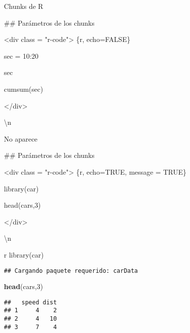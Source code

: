 \documentclass[
  ignorenonframetext,
]{beamer}
\newenvironment{Shaded}{\begin{snugshade}}{\end{snugshade}}
\newcommand{\DecValTok}[1]{\textcolor[rgb]{0.00,0.00,0.81}{#1}}
\newcommand{\FunctionTok}[1]{\textcolor[rgb]{0.13,0.29,0.53}{\textbf{#1}}}
\newcommand{\NormalTok}[1]{#1}
\begin{document}
\begin{frame}[fragile]{Chunks de R}
\begin{Shaded}
\begin{Highlighting}[]
\NormalTok{\#\# Parámetros de los chunks}

\NormalTok{\textless{}div class = "r{-}code"\textgreater{}}
\NormalTok{\textasciigrave{}\textasciigrave{}\textasciigrave{}\{r, echo=FALSE\}}

\NormalTok{\textasciigrave{} sec = 10:20\textasciigrave{}}

\NormalTok{\textasciigrave{}sec\textasciigrave{}}

\NormalTok{\textasciigrave{}cumsum(sec)\textasciigrave{}}

\NormalTok{\textasciigrave{}\textasciigrave{}\textasciigrave{}\textless{}/div\textgreater{}}

\NormalTok{\textbackslash{}n}

\NormalTok{No aparece}

\NormalTok{\#\# Parámetros de los chunks}

\NormalTok{\textless{}div class = "r{-}code"\textgreater{}}
\NormalTok{\textasciigrave{}\textasciigrave{}\textasciigrave{}\{r, echo=TRUE, message = TRUE\}}

\NormalTok{\textasciigrave{}library(car)\textasciigrave{}}

\NormalTok{\textasciigrave{}head(cars,3)\textasciigrave{}}

\NormalTok{\textasciigrave{}\textasciigrave{}\textasciigrave{}\textless{}/div\textgreater{}}

\NormalTok{\textbackslash{}n}


\NormalTok{\textasciigrave{}\textasciigrave{}\textasciigrave{} r}
\NormalTok{library(car)}
\end{Highlighting}
\end{Shaded}

\begin{verbatim}
## Cargando paquete requerido: carData
\end{verbatim}

\begin{Shaded}
\begin{Highlighting}[]
\FunctionTok{head}\NormalTok{(cars,}\DecValTok{3}\NormalTok{)}
\end{Highlighting}
\end{Shaded}

\begin{verbatim}
##   speed dist
## 1     4    2
## 2     4   10
## 3     7    4
\end{verbatim}
\end{frame}
\end{document}
